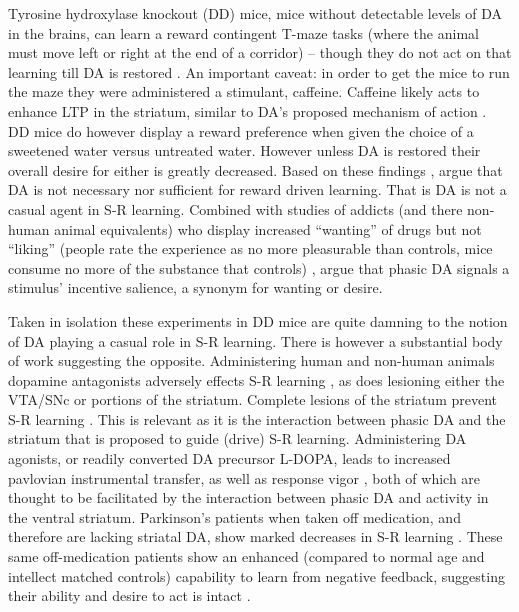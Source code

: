 \documentclass[doc]{apa}        %
\begin{document}
Tyrosine hydroxylase knockout (DD) mice, mice without detectable levels of DA in the brains, can learn a reward contingent T-maze tasks (where the animal must move left or right at the end of a corridor) -- though they do not act on that learning till DA is restored \cite{Berridge:2007p7235}.  An important caveat: in order to get the mice to run the maze they were administered a stimulant, caffeine.  Caffeine likely acts to enhance LTP in the striatum, similar to DA's proposed mechanism of action \cite{Rossi:2010p7252}.  DD mice do however display a reward preference when given the choice of a sweetened water versus untreated water. However unless DA is restored their overall desire for either is greatly decreased.  Based on these findings , argue that DA is not necessary nor sufficient for reward driven learning.  That is DA is not a casual agent in S-R learning.  Combined with studies of addicts (and there non-human animal equivalents) who display increased ``wanting'' of drugs but not ``liking'' (people rate the experience as no more pleasurable than controls, mice consume no more of the substance that controls) , argue that phasic DA signals a stimulus' incentive salience, a synonym for wanting or desire.  

Taken in isolation these experiments in DD mice are quite damning to the notion of DA playing a casual role in S-R learning.  There is however a substantial body of work suggesting the opposite.  Administering human and non-human animals dopamine antagonists adversely effects S-R learning \cite{Pizzagalli:2010p7205}, as does lesioning either the VTA/SNc or portions of the striatum.  Complete lesions of the striatum prevent S-R learning \cite{Packard:2002p5074}.  This is relevant as it is the interaction between phasic DA and the striatum that is proposed to guide (drive) S-R learning. Administering DA agonists, or readily converted DA precursor L-DOPA, leads to increased pavlovian instrumental transfer, as well as response vigor \cite{Winterbauer:2007p6352}, both of which are thought to be facilitated by the interaction between phasic DA and activity in the ventral striatum.  Parkinson's patients when taken off medication, and therefore are lacking striatal DA, show marked decreases in S-R learning \cite{Pizzagalli:2010p7205}.  These same off-medication patients show an enhanced (compared to normal age and intellect matched controls) capability to learn from negative feedback, suggesting their ability and desire to act is intact \cite{Frank:2004p4709}.  
\end{document}
